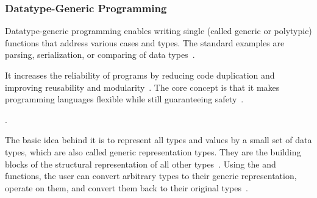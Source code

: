 \begin{frame}\frametitle{Datatype-Generic Programming}
    
Datatype-generic programming enables writing single (called generic or polytypic) functions that address various cases and types. The standard examples are parsing,  serialization, or comparing of data types~\cite{derivable-type-classes}.
 
It increases the reliability of programs by reducing code duplication and improving reusability and modularity~\cite{optimizing-generics}. The core concept is that it makes programming languages flexible while still guaranteeing safety~\cite{datatype-generic-programming}.
  
. 
    
The basic idea behind it is to represent all types and values by a small set of data types, which are also called generic representation types. They are the building blocks of the structural representation of all other types~\cite{optimizing-generics}.
Using the  and  functions, the user can convert arbitrary types to their generic representation, operate on them, and convert them back to their original types~\cite{optimizing-generics,history-of-haskell, ghc-generics}.

\end{frame}